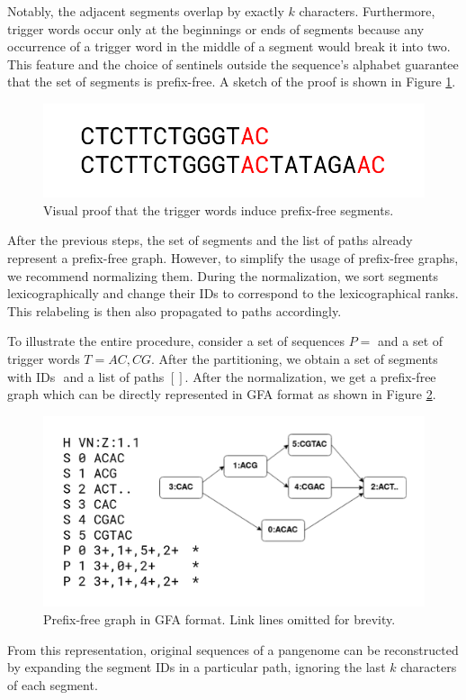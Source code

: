 Notably, the adjacent segments overlap by exactly $k$ characters.
Furthermore, trigger words occur only at the beginnings or ends of segments because any occurrence of a trigger word in the middle of a segment would break it into two.
This feature and the choice of sentinels outside the sequence's alphabet guarantee that the set of segments is prefix-free.
A sketch of the proof is shown in Figure \ref{fig:proof}.

\begin{figure}
    \centering
    \includegraphics[width=\linewidth]{images/prefixfree_proof.png}
    \caption{Visual proof that the trigger words induce prefix-free segments.}
    \label{fig:proof}
\end{figure}

After the previous steps, the set of segments and the list of paths already represent a prefix-free graph.
However, to simplify the usage of prefix-free graphs, we recommend normalizing them.
During the normalization, we sort segments lexicographically and change their IDs to correspond to the lexicographical ranks.
This relabeling is then also propagated to paths accordingly. 

To illustrate the entire procedure, consider a set of sequences $P = {}$ and a set of trigger words $T = {AC, CG}$.
After the partitioning, we obtain a set of segments with IDs ${}$ and a list of paths $[]$.
After the normalization, we get a prefix-free graph which can be directly represented in GFA format as shown in Figure \ref{fig:gfa}.

\begin{figure}
    \centering
    \includegraphics[width=\linewidth]{images/pfg_gfa.v3.png}
    \caption{Prefix-free graph in GFA format. Link lines omitted for brevity.}
    \label{fig:gfa}
\end{figure}

From this representation, original sequences of a pangenome can be reconstructed by expanding the segment IDs in a particular path, ignoring the last $k$ characters of each segment.

